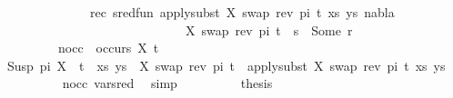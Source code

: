 \begin{isabellebody}
\ \ \ \ \isamarkupfalse%
\ {\isacharminus}{\kern0pt}\isanewline
\ \ \ \ \ \ \isamarkupfalse%
\ rec{\isacharcolon}{\kern0pt}\ {\isachardoublequoteopen}sred{\isacharunderscore}{\kern0pt}fun\ {\isacharparenleft}{\kern0pt}apply{\isacharunderscore}{\kern0pt}subst\ {\isacharbrackleft}{\kern0pt}{\isacharparenleft}{\kern0pt}X{\isacharcomma}{\kern0pt}\ swap\ {\isacharparenleft}{\kern0pt}rev\ pi{\isacharparenright}{\kern0pt}\ t{}{\isacharparenright}{\kern0pt}{\isacharbrackright}{\kern0pt}\ {\isacharparenleft}{\kern0pt}xs{\isacharcomma}{\kern0pt}\ ys{\isacharparenright}{\kern0pt}{\isacharcomma}{\kern0pt}\ nabla{\isacharcomma}{\kern0pt}\ \isanewline
\ \ \ \ \ \ \ \ \ \ \ \ \ \ \ \ \ \ \ \ \ \ \ \ \ \ \ \ \ {\isacharbrackleft}{\kern0pt}{\isacharparenleft}{\kern0pt}X{\isacharcomma}{\kern0pt}\ swap\ {\isacharparenleft}{\kern0pt}rev\ pi{\isacharparenright}{\kern0pt}\ t{}{\isacharparenright}{\kern0pt}{\isacharbrackright}{\kern0pt}\ {\isasymbullet}\ s{\isacharparenright}{\kern0pt}\ {\isacharequal}{\kern0pt}\ Some\ r{\isachardoublequoteclose}\isanewline
\ \ \ \ \ \ \ \ \ nocc{\isacharcolon}{\kern0pt}\ {\isachardoublequoteopen}{\isasymnot}\ occurs\ X\ t{}{\isachardoublequoteclose}\isanewline
\ \ \ \ \ \ \isamarkupfalse%
\ {\isachardoublequoteopen}{\isacharparenleft}{\kern0pt}{\isacharparenleft}{\kern0pt}Susp\ pi\ X\ {\isasymapprox}{\isacharquery}{\kern0pt}\ t{}{\isacharparenright}{\kern0pt}\ {\isacharhash}{\kern0pt}\ xs{\isacharcomma}{\kern0pt}\ ys{\isacharparenright}{\kern0pt}\ {\isasymturnstile}\ {\isacharbrackleft}{\kern0pt}{\isacharparenleft}{\kern0pt}X{\isacharcomma}{\kern0pt}\ swap\ {\isacharparenleft}{\kern0pt}rev\ pi{\isacharparenright}{\kern0pt}\ t{}{\isacharparenright}{\kern0pt}{\isacharbrackright}{\kern0pt}\ {\isasymleadsto}\ apply{\isacharunderscore}{\kern0pt}subst\ {\isacharbrackleft}{\kern0pt}{\isacharparenleft}{\kern0pt}X{\isacharcomma}{\kern0pt}\ swap\ {\isacharparenleft}{\kern0pt}rev\ pi{\isacharparenright}{\kern0pt}\ t{}{\isacharparenright}{\kern0pt}{\isacharbrackright}{\kern0pt}\ {\isacharparenleft}{\kern0pt}xs{\isacharcomma}{\kern0pt}\ ys{\isacharparenright}{\kern0pt}{\isachardoublequoteclose}\isanewline
\ \ \ \ \ \ \ \ \isamarkupfalse%
\ nocc\ var{\isacharunderscore}{\kern0pt}{}{\isacharunderscore}{\kern0pt}sred\ \isamarkupfalse%
\ simp\isanewline
\ \ \ \ \ \ \isamarkupfalse%
\ \isamarkupfalse%
\ {\isacharquery}{\kern0pt}thesis\ \isamarkupfalse%

\end{isabellebody}
